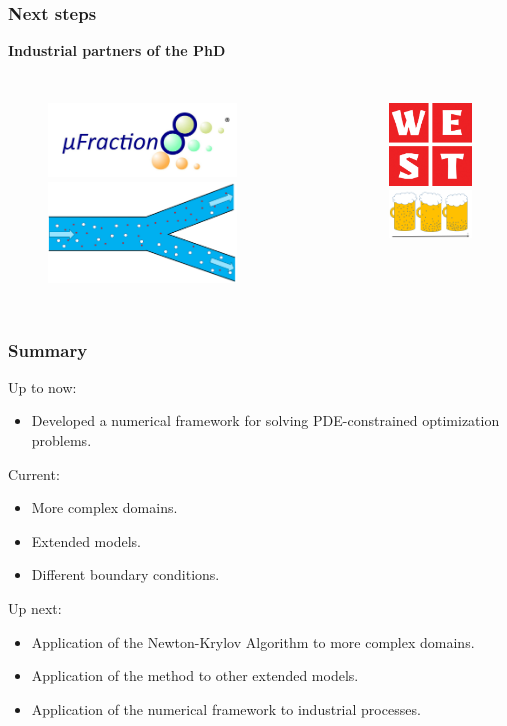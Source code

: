 \documentclass[aspectratio=169,xcolor=dvipsnames]{beamer}
\begin{document}
\begin{frame}
	\frametitle{Next steps}
	\textbf{Industrial partners of the PhD}
	\begin{columns}
		\begin{figure}
			\includegraphics[width=5cm]{ufraction8.png}
			\includegraphics[width=5cm]{Microfilter.png}
		\end{figure}
		
		\begin{figure}
			\includegraphics[width=3cm]{west.png}\\
			\includegraphics[width=3.5cm]{beer.png}
		\end{figure}
	\end{columns}
\end{frame}

\begin{frame}
	\frametitle{Summary}
	Up to now:
	\begin{itemize}
		\item Developed a numerical framework for solving PDE-constrained optimization problems.
	\end{itemize}
	Current:
	\begin{itemize}
		\item More complex domains.
		\item Extended models.
		\item Different boundary conditions.
	\end{itemize}
	Up next:
	\begin{itemize}
		\item Application of the Newton-Krylov Algorithm to more complex domains.
		\item Application of the method to other extended models.
		\item Application of the numerical framework to industrial processes.
	\end{itemize}
	
\end{frame}
\end{document}

